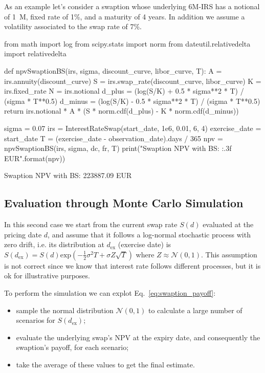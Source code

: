 As an example let's consider a swaption whose underlying 6M-IRS has a notional of 1~M, fixed rate of 1\%, and a maturity of 4 years. In addition we assume a volatility associated to the swap rate of 7\%.

\begin{ipython}
from math import log
from scipy.stats import norm
from dateutil.relativedelta import relativedelta

def npvSwaptionBS(irs, sigma,
    discount_curve, libor_curve, T):
    A = irs.annuity(discount_curve)
    S = irs.swap_rate(discount_curve, libor_curve)
    K = irs.fixed_rate
    N = irs.notional
    d_plus = (log(S/K) + 0.5 * sigma**2 * T) / (sigma * T**0.5)
    d_minus = (log(S/K) - 0.5 * sigma**2 * T) / (sigma * T**0.5)
    return irs.notional * A * (S * norm.cdf(d_plus) - K * norm.cdf(d_minus))

sigma = 0.07
irs = InterestRateSwap(start_date, 1e6, 0.01, 6, 4)
exercise_date = start_date
T = (exercise_date - observation_date).days / 365
npv = npvSwaptionBS(irs, sigma, dc, fr, T)
print("Swaption NPV with BS: {:.3f} EUR".format(npv))
\end{ipython}
\begin{ioutput}
Swaption NPV with BS: 223887.09 EUR
\end{ioutput}

\subsection{Evaluation through Monte Carlo Simulation}
\label{evaluation-through-monte-carlo-simulation}

In this second case we start from the current swap rate \(S(d)\)
evaluated at the pricing date \(d\), and assume that it follows a
log-normal stochastic process with zero drift, i.e. its distribution at
\(d_{\mathrm{ex}}\) (exercise date) is
\(S(d_{\mathrm{ex}}) = S(d)\mathrm{exp}(-\frac{1}{2}\sigma^{2}T+\sigma Z\sqrt{T})\)
where $Z\approx\mathcal{N}(0,1)$.
This assumption is not correct since we know that interest rate follows 
different processes, but it is ok for illustrative purposes. 

To perform the simulation we can explot Eq.~\ref{eq:swaption_payoff}:

\begin{itemize}
\tightlist
\item
  sample the normal distribution \(\mathcal{N}(0, 1)\) to calculate a
  large number of scenarios for \(S(d_{\mathrm{ex}})\);
\item
  evaluate the underlying swap's NPV at the expiry date, and
  consequently the swaption's payoff, for each scenario;
\item
  take the average of these values to get the final estimate.
\end{itemize}

